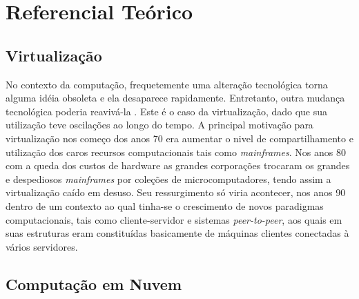 \chapter{Referencial Teórico}
\label{cap:referencial_teorico}
\section{Virtualização}
No contexto da computação, frequetemente uma alteração tecnológica torna alguma idéia obsoleta e ela desaparece rapidamente. Entretanto, outra mudança tecnológica poderia reavivá-la \cite{tanebaum}. Este é o caso da virtualização, dado que sua utilização teve oscilações ao longo do tempo. A principal motivação para virtualização nos começo dos anos 70 era aumentar o nivel de compartilhamento e utilização dos caros recursos computacionais tais como \textit{mainframes}\cite{Daniel}. Nos anos 80 com a queda dos custos de hardware as grandes corporações trocaram os grandes e despediosos \textit{mainframes} por coleções de microcomputadores, tendo assim a virtualização caído em desuso. Seu ressurgimento só viria acontecer, nos anos 90 dentro de um contexto ao qual tinha-se o crescimento de novos paradigmas computacionais, tais como cliente-servidor  e sistemas \textit{peer-to-peer}, aos quais em suas estruturas eram constituídas basicamente de máquinas clientes conectadas à vários servidores.
\section{Computação em Nuvem}